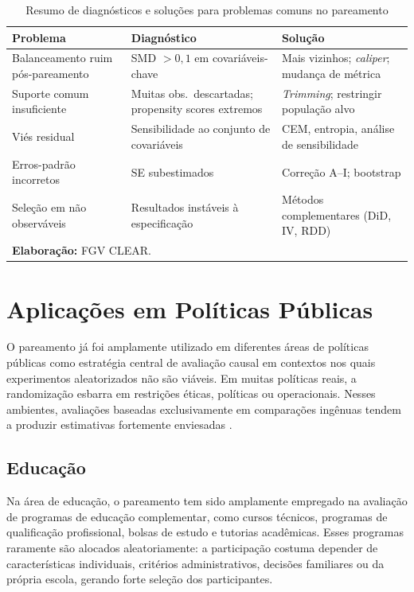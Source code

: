 \documentclass[12pt,a4paper]{article}
\begin{document}
\begin{table}[H]
\centering
\caption{Resumo de diagnósticos e soluções para problemas comuns no pareamento}
\label{tab:diagnosticos_resumo}
\footnotesize
\begin{tabular}{p{3.5cm}p{4cm}p{5.5cm}}
\toprule
\textbf{Problema} & \textbf{Diagnóstico} & \textbf{Solução} \\
\midrule
Balanceamento ruim pós-pare\-amento & SMD $> 0{,}1$ em covariáveis-chave & Mais vizinhos; \textit{caliper}; mudança de métrica \\
Suporte comum insuficiente & Muitas obs.\ descartadas; propensity scores extremos & \textit{Trimming}; restringir população alvo \\
Viés residual & Sensibilidade ao conjunto de covariáveis & CEM, entropia, análise de sensibilidade \\
Erros-padrão incorretos & SE subestimados & Correção A--I; bootstrap \\
Seleção em não observáveis & Resultados instáveis à especificação & Métodos complementares (DiD, IV, RDD) \\
\bottomrule
\multicolumn{3}{l}{\footnotesize \textbf{Elaboração:} FGV CLEAR.}
\end{tabular}
\end{table}

\newpage
\section{Aplicações em Políticas Públicas}\label{sec:aplicacoes}

O pareamento já foi amplamente utilizado em diferentes áreas de políticas públicas como estratégia central de avaliação causal em contextos nos quais experimentos aleatorizados não são viáveis. Em muitas políticas reais, a randomização esbarra em restrições éticas, políticas ou operacionais. Nesses ambientes, avaliações baseadas exclusivamente em comparações ingênuas tendem a produzir estimativas fortemente enviesadas \citep{rosenbaum1983central,rubin1974estimating}.

\subsection*{Educação}

Na área de educação, o pareamento tem sido amplamente empregado na avaliação de programas de educação complementar, como cursos técnicos, programas de qualificação profissional, bolsas de estudo e tutorias acadêmicas. Esses programas raramente são alocados aleatoriamente: a participação costuma depender de características individuais, critérios administrativos, decisões familiares ou da própria escola, gerando forte seleção dos participantes.
\end{document}
